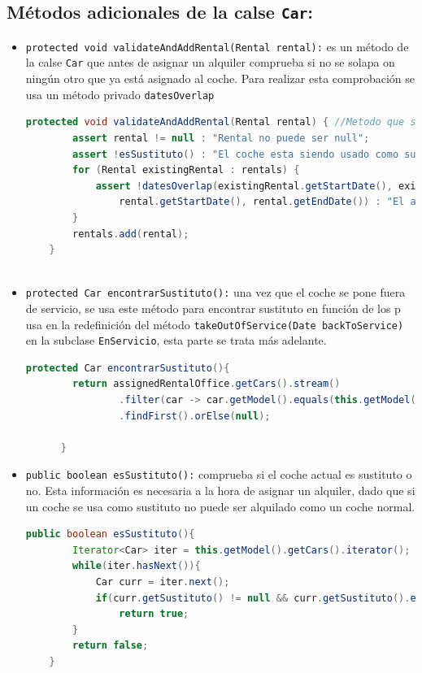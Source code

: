 \subsection*{Métodos adicionales de la calse \texttt{Car}:}
\begin{itemize}
    \item \texttt{protected void validateAndAddRental(Rental rental):} es un método de la calse \texttt{Car} que antes de asignar un alquiler comprueba si 
    no se solapa on ningún otro que ya está asignado al coche. Para realizar esta comprobación se usa un método privado  \texttt{datesOverlap} 

    \begin{lstlisting}[style = javaNormal, language=Java]
      protected void validateAndAddRental(Rental rental) { //Metodo que solo llama el estado, por lo que estamos delegandole la decision
        assert rental != null : "Rental no puede ser null";
        assert !esSustituto() : "El coche esta siendo usado como sustituto";
        for (Rental existingRental : rentals) {
            assert !datesOverlap(existingRental.getStartDate(), existingRental.getEndDate(),
                rental.getStartDate(), rental.getEndDate()) : "El alquiler se solapa con otro ya existente.";
        }
        rentals.add(rental);
    }
   
    \end{lstlisting}
    \item \texttt{protected Car encontrarSustituto():} una vez que el coche se pone fuera de servicio, se usa este método para encontrar sustituto en función de los 
    p usa en la redefinición del método \texttt{takeOutOfService(Date backToService)} en la
    subclase \texttt{EnServicio}, esta parte se trata más adelante. 
    \begin{lstlisting}[style = javaNormal, language=Java]
      protected Car encontrarSustituto(){
        return assignedRentalOffice.getCars().stream()
                .filter(car -> car.getModel().equals(this.getModel()) && car.getEstado().sePuedeAlquilar() && !car.esSustituto())
                .findFirst().orElse(null);

      }
    \end{lstlisting}
    \item \texttt{public boolean esSustituto():} comprueba si el coche actual es sustituto o no. Esta información es necesaria a la hora de 
    asignar un alquiler, dado que si un coche se usa como sustituto no puede ser alquilado como un coche normal.   
    \begin{lstlisting}[style = javaNormal, language=Java]
      public boolean esSustituto(){
        Iterator<Car> iter = this.getModel().getCars().iterator();
        while(iter.hasNext()){
            Car curr = iter.next();
            if(curr.getSustituto() != null && curr.getSustituto().equals(this))
                return true;
        }
        return false;
    }
    \end{lstlisting}
    
\end{itemize}
